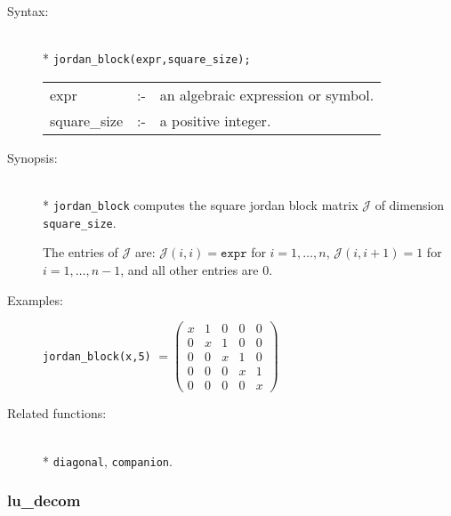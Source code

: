 \begin{description}
\item[Syntax:]\mbox{}\\*
\texttt{jordan\_block(expr,square\_size);}\\[2mm]
\begin{tabular}{l l l}
expr        &:-& an algebraic expression or symbol. \\
square\_size &:-& a positive integer.
\end{tabular}

\item[Synopsis:]\mbox{}\\*
\texttt{jordan\_block} computes the square jordan block matrix $\mathcal{J}$
                of dimension \texttt{square\_size}.

The entries of $\mathcal{J}$ are: $\mathcal{J}(i,i) = \texttt{expr}$ for
                $i=1,\ldots,n$, $\mathcal{J}(i,i+1) = 1$ for $i=1,\ldots,n-1$,
                and all other entries are 0.

\item[Examples:]\nopagebreak
\begin{flushleft}
\texttt{jordan\_block(x,5)} \(=
 \begin{pmatrix} x & 1 & 0 & 0 & 0 \\ 0 & x & 1 & 0 & 0 \\ 0
& 0 & x & 1 & 0 \\ 0 & 0 & 0 & x & 1 \\ 0 & 0 & 0 & 0 & x
 \end{pmatrix}\)
\end{flushleft}

\item[Related functions:]\mbox{}\\*
\texttt{diagonal}, \texttt{companion}.
\end{description}


\subsubsection{lu\_decom}
\label{linalg:lu_decom}

